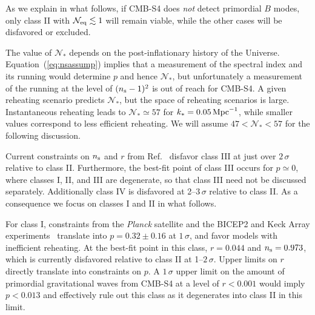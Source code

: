 As we explain in what follows, if CMB-S4 does {\it not\/} detect primordial $B$ modes, only class II with $\mathcal{N}_{\rm eq}\lesssim 1$ will remain viable,
while the other cases will be disfavored or excluded.

The value of $\mathcal{N}_\ast$ depends on the post-inflationary history of the Universe. Equation~(\ref{eq:nsassump}) implies that a measurement of the spectral index and its running would determine $p$ and hence $\mathcal{N}_\ast$, but unfortunately a measurement of the running at the level of $(n_{\rm s}-1)^2$ is out of reach for CMB-S4. A given reheating scenario predicts $\mathcal{N}_\ast$, but the space of reheating scenarios is large. Instantaneous reheating leads to $\mathcal{N}_\ast\simeq 57$ for $k_\ast=0.05\,  {\rm Mpc}^{-1}$, while smaller values correspond to less efficient reheating. We will assume $47<\mathcal{N}_\ast<57$ for the following discussion. 

Current constraints on $n_{\rm s}$ and $r$ from Ref.~\cite{Ade:2015tva} disfavor class III at just over $2\,\sigma$ relative to class II. Furthermore, the best-fit point of class III occurs for $p\simeq 0$, where classes I, II, and III are degenerate, so that class III need not be discussed separately. Additionally class IV is disfavored at 2--$3\,\sigma$ relative to class II. As a consequence we focus on classes I and II in what follows.

For class I, constraints from the {\it Planck\/} satellite and the BICEP2 and Keck Array experiments~\cite{Ade:2015tva} translate into $p=0.32\pm0.16$ at $1\,\sigma$, and favor models with inefficient reheating. At the best-fit point in this class, $r=0.044$ and $n_{\rm s}=0.973$, which is currently disfavored relative to class II at 1--$2\,\sigma$. Upper limits on $r$ directly translate into constraints on $p$. A $1\,\sigma$ upper limit on the amount of primordial gravitational waves from CMB-S4 at a level of $r<0.001$ would imply $p<0.013$ and effectively rule out this class as it degenerates into class II in this limit. 

